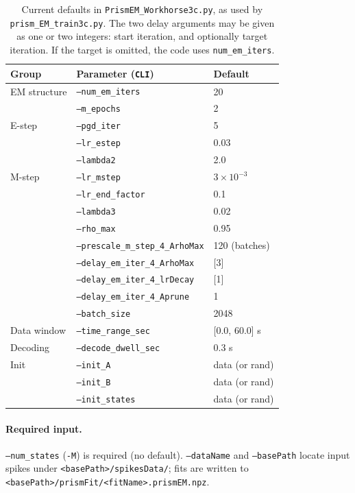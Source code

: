 \documentclass[11pt]{article}
\begin{document}
\begin{table}[h]
\centering
\begin{tabular}{lll}
\toprule
Group & Parameter (\texttt{CLI}) & Default \\
\midrule
EM structure & \texttt{--num\_em\_iters} & 20 \\
 & \texttt{--m\_epochs} & 2 \\
E-step & \texttt{--pgd\_iter} & 5 \\
 & \texttt{--lr\_estep} & 0.03 \\
 & \texttt{--lambda2} & 2.0 \\
M-step & \texttt{--lr\_mstep} & \(3 \times 10^{-3}\) \\
 & \texttt{--lr\_end\_factor} & 0.1 \\
 & \texttt{--lambda3} & 0.02 \\
 & \texttt{--rho\_max} & 0.95 \\
 & \texttt{--prescale\_m\_step\_4\_ArhoMax} & 120 (batches) \\
 & \texttt{--delay\_em\_iter\_4\_ArhoMax} & [3] \\
 & \texttt{--delay\_em\_iter\_4\_lrDecay} & [1] \\
 & \texttt{--delay\_em\_iter\_4\_Aprune} & 1 \\
 & \texttt{--batch\_size} & 2048 \\
Data window & \texttt{--time\_range\_sec} & [0.0, 60.0] s \\
Decoding & \texttt{--decode\_dwell\_sec} & 0.3 s \\
Init & \texttt{--init\_A} & data (or rand)\\
 & \texttt{--init\_B} & data (or rand) \\
 & \texttt{--init\_states} & data (or rand) \\
\bottomrule
\end{tabular}
\caption{Current defaults in \texttt{PrismEM\_Workhorse3c.py}, as used by
\texttt{prism\_EM\_train3c.py}. The two delay arguments may be given as one
or two integers: start iteration, and optionally target iteration. If the
target is omitted, the code uses \texttt{num\_em\_iters}.}
\end{table}

\paragraph{Required input.}
\texttt{--num\_states} (\texttt{-M}) is required (no default).
\texttt{--dataName} and \texttt{--basePath} locate input spikes under
\texttt{<basePath>/spikesData/}; fits are written to
\texttt{<basePath>/prismFit/<fitName>.prismEM.npz}.
\end{document}
